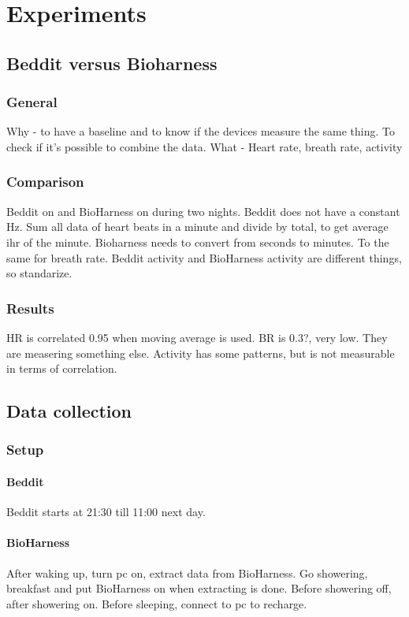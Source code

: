 \section{Experiments}
	\subsection{Beddit versus Bioharness}
		\subsubsection{General}
			Why - to have a baseline and to know if the devices measure the same thing. To check if it's possible to combine the data.
			What - Heart rate, breath rate, activity
		\subsubsection{Comparison}
			Beddit on and BioHarness on during two nights.
			Beddit does not have a constant Hz. Sum all data of heart beats in a minute and divide by total, to get average ihr of the minute. 
			Bioharness needs to convert from seconds to minutes. To the same for breath rate. 
			Beddit activity and BioHarness activity are different things, so standarize.

		\subsubsection{Results}
			HR is correlated 0.95 when moving average is used.
			BR is 0.3?, very low. They are measering something else.
			Activity has some patterns, but is not measurable in terms of correlation.
	\subsection{Data collection}
		\subsubsection{Setup}
			\paragraph{Beddit}
				Beddit starts at 21:30 till 11:00 next day. 
			\paragraph{BioHarness}
				After waking up, turn pc on, extract data from BioHarness. Go showering, breakfast and put BioHarness on when extracting is done. Before showering off, after showering on. Before sleeping, connect to pc to recharge. 
